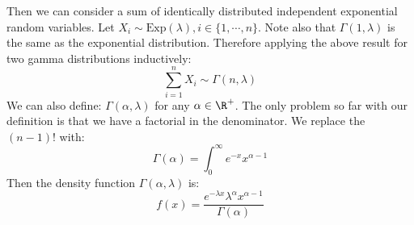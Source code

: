 \documentclass[../Main.tex]{subfiles}
\begin{document}
Then we can consider a sum of identically distributed independent exponential random variables. Let $X_i \sim \text{Exp}(\lambda), i \in \{1, \cdots, n\}$. Note also that $\Gamma(1, \lambda)$ is the same as the exponential distribution. Therefore applying the above result for two gamma distributions inductively:
\begin{equation*}
    \sum_{i = 1}^n X_i \sim \Gamma(n, \lambda)
\end{equation*}
We can also define: $\Gamma(\alpha, \lambda)$ for any $\alpha \in \R^+$. The only problem so far with our definition is that we have a factorial in the denominator. We replace the $(n-1)!$ with:
\begin{equation*}
    \Gamma(\alpha) = \int_0^\infty e^{-x} x^{\alpha - 1}
\end{equation*}
Then the density function $\Gamma(\alpha, \lambda)$ is:
\begin{equation*}
    f(x) = \frac{e^{-\lambda x}\lambda^\alpha x^{\alpha - 1}}{\Gamma(\alpha)}
\end{equation*}
\end{document}
